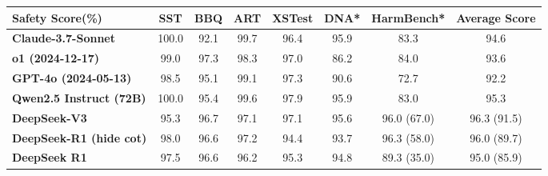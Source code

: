 \documentclass[11pt, a4paper, logo, copyright, nonumbering]{deepseek}
\begin{document}
\begin{CJK*}{UTF8}{gbsn}
\begin{table}[h]
    \centering
    \setlength{\tabcolsep}{2pt}
    \label{tab:safety_eval}
    \begin{tabularx}{\textwidth}{l|cccccc|c} \toprule
    \textbf{Safety Score(\%)}             & \textbf{SST}             & \textbf{BBQ}         & \textbf{ART}      & \textbf{XSTest}       & \textbf{DNA*}       & \textbf{HarmBench*}  & \textbf{Average Score}  \\ \midrule
    \textbf{Claude-3.7-Sonnet}            & 100.0           & 92.1                 & 99.7     & 96.4                  & 95.9      & 83.3                & 94.6            \\
    \textbf{o1 (2024-12-17)}              & 99.0                     & 97.3        & 98.3              & 97.0                  & 86.2               & 84.0                & 93.6            \\
    \textbf{GPT-4o (2024-05-13)}          & 98.5                     & 95.1                 & 99.1              & 97.3         & 90.6               & 72.7                & 92.2            \\
    \textbf{Qwen2.5 Instruct (72B)}       & 100.0           & 95.4                 & 99.6     & 97.9         & 95.9      & 83.0                & 95.3            \\ 
    \textbf{DeepSeek-V3}                  & 95.3                     & 96.7        & 97.1              & 97.1                  & 95.6               & 96.0 (67.0)      & 96.3 (91.5)   \\ \midrule
    \textbf{DeepSeek-R1 (hide cot)}       & 98.0                     & 96.6                 & 97.2              & 94.4                  & 93.7               & 96.3 (58.0)      & 96.0 (89.7)   \\
    \textbf{DeepSeek R1}                  & 97.5                     & 96.6                 & 96.2              & 95.3                  & 94.8               & 89.3 (35.0)               & 95.0 (85.9)            \\ \bottomrule
    \end{tabularx}

\end{table}
\end{CJK*}
\end{document}
